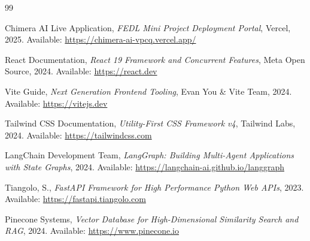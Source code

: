 \begin{thebibliography}{99}

Chimera AI Live Application, \textit{FEDL Mini Project Deployment Portal}, Vercel, 2025. Available: \url{https://chimera-ai-vpcq.vercel.app/}

React Documentation, \textit{React 19 Framework and Concurrent Features}, Meta Open Source, 2024. Available: \url{https://react.dev}

Vite Guide, \textit{Next Generation Frontend Tooling}, Evan You \& Vite Team, 2024. Available: \url{https://vitejs.dev}

Tailwind CSS Documentation, \textit{Utility-First CSS Framework v4}, Tailwind Labs, 2024. Available: \url{https://tailwindcss.com}

LangChain Development Team, \textit{LangGraph: Building Multi-Agent Applications with State Graphs}, 2024. Available: \url{https://langchain-ai.github.io/langgraph}

Tiangolo, S., \textit{FastAPI Framework for High Performance Python Web APIs}, 2023. Available: \url{https://fastapi.tiangolo.com}

Pinecone Systems, \textit{Vector Database for High-Dimensional Similarity Search and RAG}, 2024. Available: \url{https://www.pinecone.io}

\end{thebibliography}
